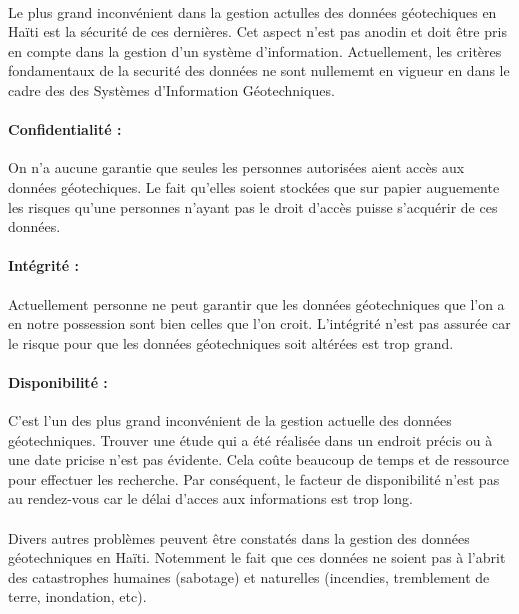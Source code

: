 \paragraph{}
Le plus grand inconvénient dans la gestion actulles des données géotechiques
en Haïti est la sécurité de ces dernières. 
Cet aspect n'est pas anodin et doit être pris en compte dans la gestion d'un système
d'information.
Actuellement, les critères fondamentaux de la securité des données ne sont nullememt en vigueur en dans le cadre des 
des Systèmes d'Information Géotechniques.
\paragraph{Confidentialité : }
On n'a aucune garantie que seules les personnes autorisées 
aient accès aux données géotechiques. Le fait qu'elles soient
stockées que sur papier auguemente les risques qu'une personnes
n'ayant pas le droit d'accès puisse s'acquérir de ces données.
\paragraph{Intégrité : }
Actuellement personne ne peut
garantir que les données géotechniques que l'on a en notre possession 
sont bien celles que l’on croit. L'intégrité n'est pas assurée car le risque
pour que les données géotechniques soit altérées est trop grand.
\paragraph{Disponibilité :}
C'est l'un des plus grand inconvénient de la gestion actuelle des 
données géotechniques. Trouver une étude qui a été réalisée dans un endroit précis
ou à une date pricise n'est pas évidente. Cela coûte beaucoup de temps et de ressource pour effectuer
les recherche. Par conséquent, le facteur de disponibilité n'est pas 
au rendez-vous car le délai d'acces aux informations est trop long.

\paragraph{}
Divers autres problèmes peuvent être constatés dans la gestion
des données géotechniques en Haïti. Notemment le fait que ces données
ne soient pas à l'abrit des catastrophes humaines (sabotage) et naturelles
(incendies, tremblement de terre, inondation, etc).


